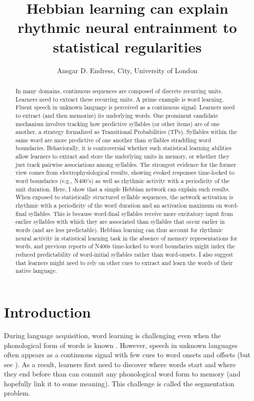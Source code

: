 \documentclass[
]{article}
\title{Hebbian learning can explain rhythmic neural entrainment to
statistical regularities}
\author{Ansgar D. Endress, City, University of London}
\date{}
\begin{document}
\maketitle
\begin{abstract}
In many domains, continuous sequences are composed of discrete recurring
units. Learners need to extract these recurring units. A prime example
is word learning. Fluent speech in unknown language is perceived as a
continuous signal. Learners need to extract (and then memorize) its
underlying words. One prominent candidate mechanism involves tracking
how predictive syllables (or other items) are of one another, a strategy
formalized as Transitional Probabilities (TPs). Syllables within the
same word are more predictive of one another than syllables straddling
word boundaries. Behaviorally, it is controversial whether such
statistical learning abilities allow learners to extract and store the
underlying units in memory, or whether they just track pairwise
associations among syllables. The strongest evidence for the former view
comes from electrophysiological results, showing evoked responses
time-locked to word boundaries (e.g., N400's) as well as rhythmic
activity with a periodicity of the unit duration. Here, I show that a
simple Hebbian network can explain such results. When exposed to
statistically structured syllable sequences, the network activation is
rhythmic with a periodicity of the word duration and an activation
maximum on word-final syllables. This is because word-final syllables
receive more excitatory input from earlier syllables with which they are
associated than syllables that occur earlier in words (and are less
predictable). Hebbian learning can thus account for rhythmic neural
activity in statistical learning task in the absence of memory
representations for words, and previous reports of N400s time-locked to
word boundaries might index the reduced predictability of word-initial
syllables rather than word-onsets. I also suggest that learners might
need to rely on other cues to extract and learn the words of their
native language.
\end{abstract}

\hypertarget{introduction}{%
\section{Introduction}\label{introduction}}

During language acquisition, word learning is challenging even when the
phonological form of words is known \citep{Gillette1999, Medina2011}.
However, speech in unknown languages often appears as a continuous
signal with few cues to word onsets and offsets (but see
\citep{Brentari2011, Christophe2001, Endress-cross-seg, Johnson2001a, Johnson2009, Pilon1981, Shukla2007, Shukla2011}).
As a result, learners first need to discover where words start and where
they end before than can commit any phonological word form to memory
\citep{Aslin1998, Saffran-Science, Saffran1996b} (and hopefully link it
to some meaning). This challenge is called the segmentation problem.
\end{document}
